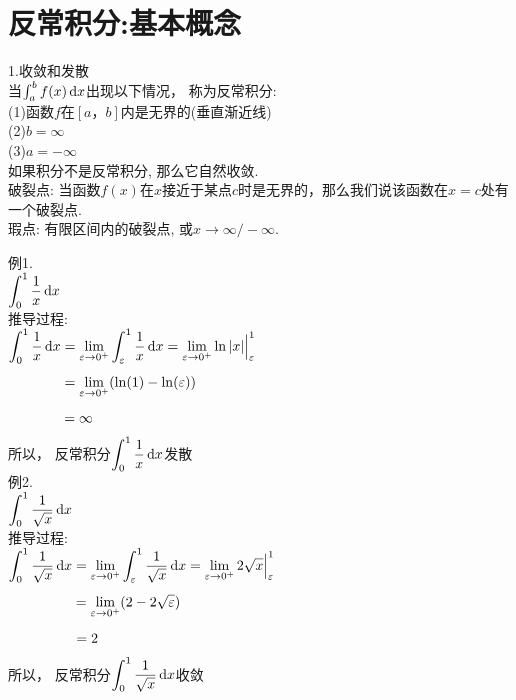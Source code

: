 \chapter{反常积分:基本概念}
1.收敛和发散\\
当$\int_a^bf(x)\mathop{}\!\mathrm{d} x$出现以下情况， 称为反常积分:\\
(1)函数$f$在$[a，b]$内是无界的(垂直渐近线)\\
(2)$b=\infty$\\
(3)$a=-\infty$\\[2ex]

如果积分不是反常积分, 那么它自然收敛.\\
破裂点: 当函数$f(x)$在$x$接近于某点$c$时是无界的，那么我们说该函数在$x=c$处有一个破裂点.\\
瑕点: 有限区间内的破裂点, 或$x\to\infty/-\infty$.\\[2ex]

{\par\centering
{}
\par}
例1.\\
\phantom{例}$\displaystyle\int_0^1\frac{1}{x}\mathop{}\!\mathrm{d} x$\\
推导过程:\\
$\displaystyle\int_0^1\frac{1}{x}\mathop{}\!\mathrm{d} x=\lim_{\varepsilon\to 0^+}\int_{\varepsilon}^1\frac{1}{x}\mathop{}\!\mathrm{d} x=\lim_{\varepsilon\to 0^+}\ln|x|\Big|_{\varepsilon}^1$\\
$\displaystyle\phantom{\int_0^1\frac{1}{x}\dif x}=\lim_{\varepsilon\to 0^+}(\ln(1)-\ln(\varepsilon))$\\
$\displaystyle\phantom{\int_0^1\frac{1}{x}\dif x}=\infty$\\
所以， 反常积分$\displaystyle\int_0^1\frac{1}{x}\mathop{}\!\mathrm{d} x$发散\\[2ex]

例2.\\
\phantom{例}$\displaystyle\int_0^1\frac{1}{\sqrt{x}}\mathop{}\!\mathrm{d} x$\\
推导过程:\\
$\displaystyle\int_0^1\frac{1}{\sqrt{x}}\mathop{}\!\mathrm{d} x=\lim_{\varepsilon\to 0^+}\int_{\varepsilon}^1\frac{1}{\sqrt{x}}\mathop{}\!\mathrm{d} x=\lim_{\varepsilon\to 0^+}2\sqrt{x}\Big|_{\varepsilon}^1$\\
$\displaystyle\phantom{\int_0^1\frac{1}{\sqrt{x}}\dif x}=\lim_{\varepsilon\to 0^+}(2-2\sqrt{\varepsilon})$\\
$\displaystyle\phantom{\int_0^1\frac{1}{\sqrt{x}}\dif x}=2$\\
所以， 反常积分$\displaystyle\int_0^1\frac{1}{\sqrt{x}}\mathop{}\!\mathrm{d} x$收敛\\[2ex]

